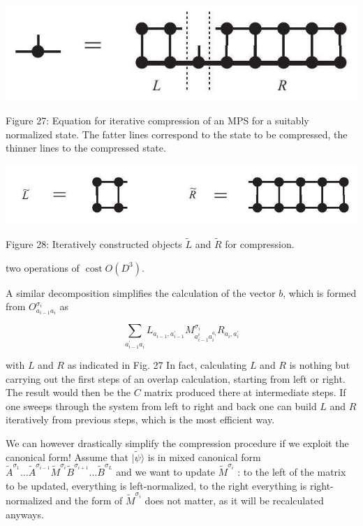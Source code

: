 \documentclass[12pt]{article}
\begin{document}
\begin{center}
\includegraphics[max width=\textwidth]{2024_05_04_afc4ad226da9ccfe0ac8g-048(1)}
\end{center}

Figure 27: Equation for iterative compression of an MPS for a suitably normalized state. The fatter lines correspond to the state to be compressed, the thinner lines to the compressed state.

\begin{center}
\includegraphics[max width=\textwidth]{2024_05_04_afc4ad226da9ccfe0ac8g-048}
\end{center}

Figure 28: Iteratively constructed objects $\tilde{L}$ and $\tilde{R}$ for compression.

two operations of $\operatorname{cost} O\left(D^{3}\right)$.

A similar decomposition simplifies the calculation of the vector $b$, which is formed from $O_{a_{i-1} a_{i}}^{\sigma_{i}}$ as


\begin{equation*}
\sum_{a_{i-1}^{\prime} a_{i}} L_{a_{i-1}, a_{i-1}^{\prime}} M_{a_{i-1}^{i} a_{i}^{a_{i}}}^{\sigma_{i}} R_{a_{i}, a_{i}^{\prime}} \tag{148}
\end{equation*}


with $L$ and $R$ as indicated in Fig. 27 In fact, calculating $L$ and $R$ is nothing but carrying out the first steps of an overlap calculation, starting from left or right. The result would then be the $C$ matrix produced there at intermediate steps. If one sweeps through the system from left to right and back one can build $L$ and $R$ iteratively from previous steps, which is the most efficient way.

We can however drastically simplify the compression procedure if we exploit the canonical form! Assume that $|\tilde{\psi}\rangle$ is in mixed canonical form $\tilde{A}^{\sigma_{1}} \ldots \tilde{A}^{\sigma_{i-1}} \tilde{M}^{\sigma_{i}} \tilde{B}^{\sigma_{i+1}} \ldots \tilde{B}^{\sigma_{L}}$ and we want to update $\tilde{M}^{\sigma_{i}}$ : to the left of the matrix to be updated, everything is left-normalized, to the right everything is right-normalized and the form of $\tilde{M}^{\sigma_{i}}$ does not matter, as it will be recalculated anyways.
\end{document}
